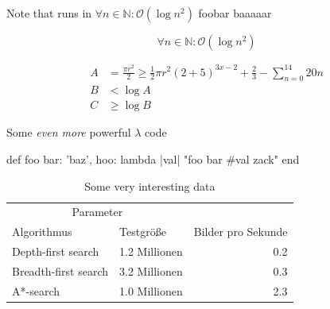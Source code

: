 \documentclass{thesis}
\begin{document}
Note that  runs\cite{patrick_rothfuss_name_2012} in \( \forall n \in \mathbb{N}: \mathcal{O}(\log n^2) \) foobar\cite{patrick_rothfuss_furcht_2011} baaaaar\cite{patrick_rothfuss_furcht_2012}

\[
\forall n \in \mathbb{N}: \mathcal{O}(\log n^2)
\]

\begin{align}
  A & = \frac{\pi r^2}{2} \geq \frac{1}{2} \pi r^2 (2 + 5)^{3x - 2} + \frac{2}{3} - \sum_{n=0}^{14}{20n}\\
  B & < \log A\\
  C & \geq \log B
\end{align}

\blindtext

\begin{listing}
  \caption{Some \emph{even more} powerful $\lambda$ code}
  \begin{rubycode}
def foo
  { bar: 'baz', hoo: lambda { |val| "foo bar #{val} zack" } }
end
  \end{rubycode}
\end{listing}

\blindtext

\begin{table}
  \caption{Some very interesting data}
  \center
  \begin{tabular}{l l r}
  \toprule
  \multicolumn{2}{c}{Parameter}\\
  \cmidrule{1-2}
  Algorithmus & Testgröße & Bilder pro Sekunde\\
  \midrule
  Depth-first search & 1.2 Millionen & 0.2\\
  \addlinespace
  Breadth-first search & 3.2 Millionen & 0.3\\
  \addlinespace
  A*-search & 1.0 Millionen & 2.3\\
  \bottomrule
  \end{tabular}
\end{table}

\Blinddocument
\end{document}
